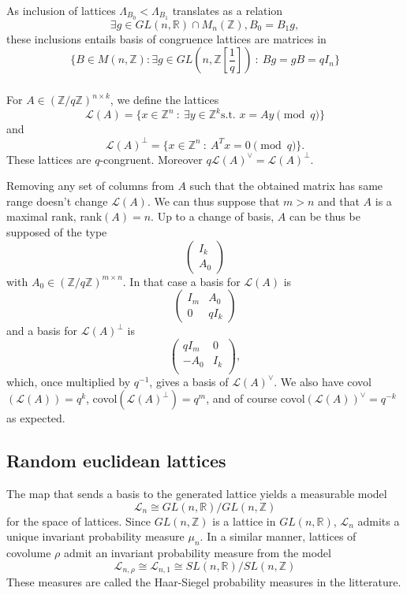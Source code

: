 \documentclass{article}
\begin{document}
As inclusion of lattices $\Lambda_{B_0} < \Lambda_{B_1}$ translates as a relation
\[\exists g \in  GL(n,\mathbb R) \cap M_n(\mathbb Z) , B_0 = B_1g , \] 
these inclusions entails basis of congruence lattices are matrices in 
\[\{B\in M(n,\mathbb Z) : \exists g\in GL(n,\mathbb Z[\frac{1}{q}] ) \ : \ Bg = gB = qI_n \}\]
   
\subsubsection{}

For $A\in (\mathbb Z/q\mathbb Z)^{n\times k}$, we define the lattices
\[\mathcal L(A) = \{x\in\mathbb Z^{n} \ : \ \exists y\in\mathbb Z^k \text{s.t. } x = Ay \pmod{q} \}\]
and
\[\mathcal L(A)^\perp = \{x\in\mathbb Z^{n} \ :\ A^{T}x = 0 \pmod{q} \}.\]
These lattices are $q$-congruent. Moreover $q\mathcal L(A)^\vee = \mathcal L(A)^\perp$.   

Removing any set of columns from $A$ such that the obtained matrix has same range doesn't change $\mathcal L(A)$. We can thus suppose that $m>n$ and that $A$ is a maximal rank, rank$(A)=n$. Up to a change of basis, $A$ can be thus be supposed of the type 
\[\begin{pmatrix}
I_k \\
A_0
\end{pmatrix}\]
with $A_0\in (\mathbb Z/q\mathbb Z)^{m\times n}$. In that case a basis for $\mathcal L(A)$ is 
\[
\begin{pmatrix}
  I_m & A_0 \\ 0 & qI_k 
\end{pmatrix}
\]
and a basis for $\mathcal L(A)^\perp$ is 
\[
\begin{pmatrix}
  q I_m & 0 \\  - A_0 & I_k \\
\end{pmatrix},
\]
which, once multiplied by $q^{-1}$, gives a basis of $\mathcal L(A)^\vee$. We also have covol$(\mathcal L(A))=q^{k}$, covol$(\mathcal L(A)^\perp)=q^{m}$, and of course covol$(\mathcal L(A))^\vee=q^{-k}$ as expected.


\subsection{Random euclidean lattices}
The map that sends a basis to the generated lattice yields a measurable model 
\[\mathcal L_n \cong  GL(n,\mathbb R) / GL(n,\mathbb Z) \]
for the space of lattices. Since $GL(n,\mathbb Z)$ is a lattice in $GL(n,\mathbb R)$, $\mathcal L_n$ admits a unique invariant probability measure $\mu_n$. In a similar manner, lattices of covolume $\rho$ admit an invariant probability measure from the model 
\[\mathcal L_{n,\rho} \cong \mathcal L_{n,1}\cong SL(n,\mathbb R) / SL(n,\mathbb Z)\]
These measures are called the Haar-Siegel probability measures in the litterature.
\end{document}
